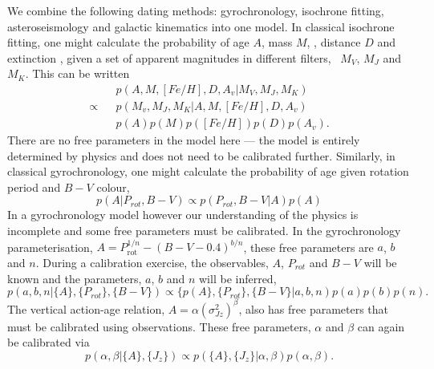 \documentclass[12pt]{article}
\begin{document}
We combine the following dating methods: gyrochronology, isochrone fitting,
asteroseismology and galactic kinematics into one model.
In classical isochrone fitting, one might calculate the probability of age
$A$, mass $M$, \feh, distance $D$ and extinction \av, given a set of
apparent magnitudes in different filters, \eg\ $M_V$, $M_J$ and $M_K$.
This can be written
\begin{eqnarray}
    &&p(A, M, [Fe/H], D, A_v | M_V, M_J, M_K) \\ \nonumber
    \propto &&p(M_v, M_J, M_K | A, M, [Fe/H], D, A_v) \\ \nonumber
    &&p(A)p(M)p([Fe/H])p(D)p(A_v).
\end{eqnarray}
There are no free parameters in the model here --- the model is entirely
determined by physics and does not need to be calibrated further.
Similarly, in classical gyrochronology, one might calculate the probability of
age given rotation period and $B-V$ colour,
\begin{equation}
    p(A | P_{rot}, B-V) \propto p(P_{rot}, B-V | A)p(A)
\end{equation}
In a gyrochronology model however our understanding of the physics is
incomplete and some free parameters must be calibrated.
In the \citet{Barnes2003} gyrochronology parameterisation, $A =
P_{\mathrm{rot}}^{1/n} - (B-V-0.4)^{b/n}$, these free parameters are $a$, $b$
and $n$.
During a calibration exercise, the observables, $A$, $P_{rot}$ and $B-V$ will
be known and the parameters, $a$, $b$ and $n$ will be inferred,
\begin{equation}
    p(a, b, n | \{A\}, \{P_{rot}\}, \{B-V\}) \propto \{p(A\}, \{P_{rot}\},
    \{B-V\} | a, b, n) p(a)p(b)p(n).
\end{equation}
The vertical action-age relation, $A = \alpha (\sigma_{Jz}^2)^\beta$,
also has free parameters that must be calibrated using observations.
These free parameters, $\alpha$ and $\beta$ can again be calibrated via
\begin{equation}
    p(\alpha, \beta | \{A\}, \{J_z\}) \propto p(\{A\}, \{J_z\} | \alpha,
    \beta) p(\alpha, \beta).
\end{equation}
\end{document}
